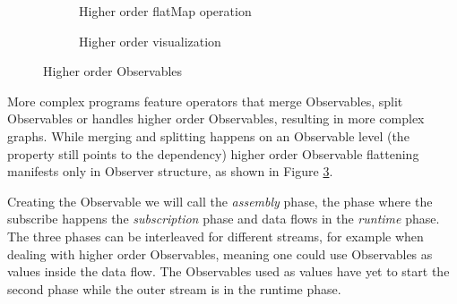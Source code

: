 \begin{figure}

\begin{subfigure}[a]{\columnwidth}
\inputminted[tabsize=2]{javascript}{listings/sample3.js}	
\caption{Higher order flatMap operation}
\label{sample3}
\end{subfigure}

\begin{subfigure}[b]{\columnwidth}
\centering

\caption{Higher order visualization}
\label{chainhigher}
\end{subfigure}

\caption{Higher order Observables}

\end{figure}

More complex programs feature operators that merge Observables, split Observables or handles higher order Observables, resulting in more complex graphs. While merging and splitting happens on an Observable level (the  property still points to the dependency) higher order Observable flattening manifests only in Observer structure, as shown in Figure \ref{chainhigher}.

Creating the Observable we will call the \textit{assembly} phase, the phase where the subscribe happens the \textit{subscription} phase and data flows in the \textit{runtime} phase. The three phases can be interleaved for different streams, for example when dealing with higher order Observables,  meaning one could use Observables as values inside the data flow. The Observables used as values have yet to start the second phase while the outer stream is in the runtime phase.
